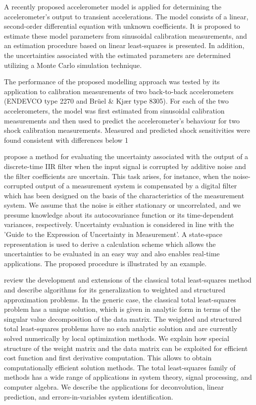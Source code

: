 \documentclass[11pt]{article}
\begin{document}
\citet{Link07} A recently proposed accelerometer model is applied for determining the accelerometer's output to transient accelerations. The model consists of a linear, second-order differential equation with unknown coefficients. It is proposed to estimate these model parameters from sinusoidal calibration measurements, and an estimation procedure based on linear least-squares is presented. In addition, the uncertainties associated with the estimated parameters are determined utilizing a Monte Carlo simulation technique.

The performance of the proposed modelling approach was tested by its application to calibration measurements of two back-to-back accelerometers (ENDEVCO type 2270 and Br{\"u}el \& Kj{\ae}r type 8305). For each of the two accelerometers, the model was first estimated from sinusoidal calibration measurements and then used to predict the accelerometer's behaviour for two shock calibration measurements. Measured and predicted shock sensitivities were found consistent with differences below 1%

\citet{Link09} propose a method  for evaluating the uncertainty associated with the output of a discrete-time IIR filter when the input signal is corrupted by additive noise and the filter coefficients are uncertain. This task arises, for instance, when the noise-corrupted output of a measurement system is compensated by a digital filter which has been designed on the basis of the characteristics of the measurement system. We assume that the noise is either stationary or uncorrelated, and we presume knowledge about its autocovariance function or its time-dependent variances, respectively. Uncertainty evaluation is considered in line with the 'Guide to the Expression of Uncertainty in Measurement'. A state-space representation is used to derive a calculation scheme which allows the uncertainties to be evaluated in an easy way and also enables real-time applications. The proposed procedure is illustrated by an example.

\citet{Markovsky07overview} review the development and extensions of the classical total least-squares method and describe algorithms for its generalization to weighted and structured approximation problems. In the generic case, the classical total least-squares problem has a unique solution, which is given in analytic form in terms of the singular value decomposition of the data matrix. The weighted and structured total least-squares problems have no such analytic solution and are currently solved numerically by local optimization methods. We explain how special structure of the weight matrix and the data matrix can be exploited for efficient cost function and first derivative computation. This allows to obtain computationally efficient solution methods. The total least-squares family of methods has a wide range of applications in system theory, signal processing, and computer algebra. We describe the applications for deconvolution, linear prediction, and errors-in-variables system identification.
\end{document}
